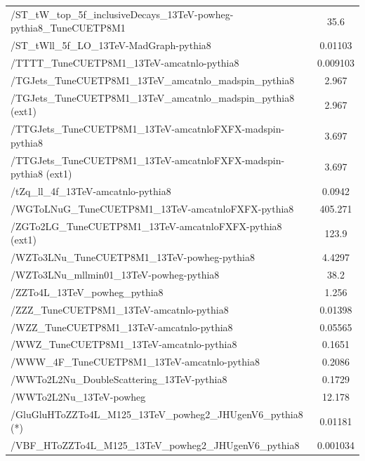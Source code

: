 \begin{table}[h]
\begin{center}
{\begin{tabular}{|l|c|}
/ST\_tW\_top\_5f\_inclusiveDecays\_13TeV-powheg-pythia8\_TuneCUETP8M1         & 35.6 \\
/ST\_tWll\_5f\_LO\_13TeV-MadGraph-pythia8                                     & 0.01103\\
/TTTT\_TuneCUETP8M1\_13TeV-amcatnlo-pythia8                                   & 0.009103 \\
/TGJets\_TuneCUETP8M1\_13TeV\_amcatnlo\_madspin\_pythia8                      & 2.967 \\
/TGJets\_TuneCUETP8M1\_13TeV\_amcatnlo\_madspin\_pythia8 (ext1)               & 2.967 \\
/TTGJets\_TuneCUETP8M1\_13TeV-amcatnloFXFX-madspin-pythia8                    & 3.697 \\
/TTGJets\_TuneCUETP8M1\_13TeV-amcatnloFXFX-madspin-pythia8 (ext1)             & 3.697 \\
/tZq\_ll\_4f\_13TeV-amcatnlo-pythia8                                          & 0.0942 \\
/WGToLNuG\_TuneCUETP8M1\_13TeV-amcatnloFXFX-pythia8                           & 405.271 \\
/ZGTo2LG\_TuneCUETP8M1\_13TeV-amcatnloFXFX-pythia8 (ext1)                     & 123.9 \\
/WZTo3LNu\_TuneCUETP8M1\_13TeV-powheg-pythia8                                 & 4.4297\\
/WZTo3LNu\_mllmin01\_13TeV-powheg-pythia8                                     & 38.2\\
/ZZTo4L\_13TeV\_powheg\_pythia8                                               & 1.256 \\
/ZZZ\_TuneCUETP8M1\_13TeV-amcatnlo-pythia8                                    & 0.01398 \\
/WZZ\_TuneCUETP8M1\_13TeV-amcatnlo-pythia8                                    & 0.05565 \\
/WWZ\_TuneCUETP8M1\_13TeV-amcatnlo-pythia8                                    & 0.1651 \\
/WWW\_4F\_TuneCUETP8M1\_13TeV-amcatnlo-pythia8                                & 0.2086 \\
/WWTo2L2Nu\_DoubleScattering\_13TeV-pythia8                                   & 0.1729 \\
/WWTo2L2Nu\_13TeV-powheg                                                      & 12.178 \\
/GluGluHToZZTo4L\_M125\_13TeV\_powheg2\_JHUgenV6\_pythia8 (*)                 & 0.01181 \\
/VBF\_HToZZTo4L\_M125\_13TeV\_powheg2\_JHUgenV6\_pythia8                      & 0.001034 \\

\end{tabular}}
\end{center}
\end{table}
